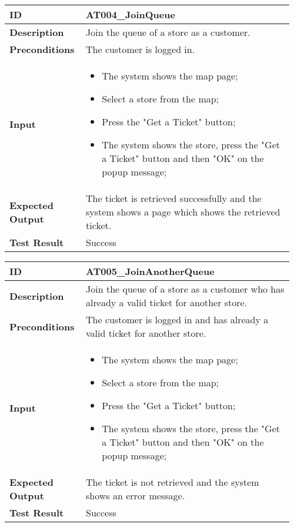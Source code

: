 \begin{table}[H]
	\centering
	\begin{tabular}{@{}p{0.25\linewidth}p{0.71\linewidth}@{}}
		\toprule
		\textbf{ID} & AT004\_JoinQueue \\
		\midrule
		\textbf{Description} & Join the queue of a store as a customer. \\
		\midrule
		\textbf{Preconditions} & The customer is logged in.\\
		\midrule
		\textbf{Input} & \begin{itemize}[leftmargin=.4cm,noitemsep,topsep=0pt,before=\vspace{-3mm},after=\vspace{-4mm}]
			\item The system shows the map page;
			\item Select a store from the map;
			\item Press the "Get a Ticket" button;
			\item The system shows the store, press the "Get a Ticket" button and then "OK" on the popup message;
		\end{itemize}\\
		\midrule
		\textbf{Expected Output} & The ticket is retrieved successfully and the system shows a page which shows the retrieved ticket.\\
		\midrule
		\textbf{Test Result} & Success\\
		\bottomrule
	\end{tabular}
\end{table}

\begin{table}[H]
	\centering
	\begin{tabular}{@{}p{0.25\linewidth}p{0.71\linewidth}@{}}
		\toprule
		\textbf{ID} & AT005\_JoinAnotherQueue \\
		\midrule
		\textbf{Description} & Join the queue of a store as a customer who has already a valid ticket for another store. \\
		\midrule
		\textbf{Preconditions} & The customer is logged in and has already a valid ticket for another store.\\
		\midrule
		\textbf{Input} & \begin{itemize}[leftmargin=.4cm,noitemsep,topsep=0pt,before=\vspace{-3mm},after=\vspace{-4mm}]
			\item The system shows the map page;
			\item Select a store from the map;
			\item Press the "Get a Ticket" button;
			\item The system shows the store, press the "Get a Ticket" button and then "OK" on the popup message;
		\end{itemize}\\
		\midrule
		\textbf{Expected Output} & The ticket is not retrieved and the system shows an error message.\\
		\midrule
		\textbf{Test Result} & Success\\
		\bottomrule
	\end{tabular}
\end{table}


